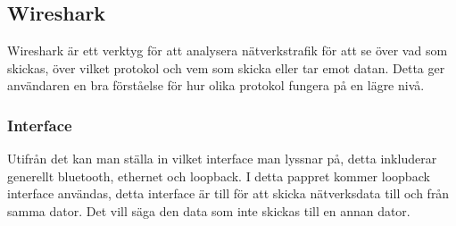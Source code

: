 \subsection{Wireshark}
Wireshark\cite{wireshark:main} är ett verktyg för att analysera nätverkstrafik för att se över vad som skickas, över vilket protokol och vem som skicka eller tar emot datan. Detta ger användaren en bra förståelse för hur olika protokol fungera på en lägre nivå.

\subsubsection{Interface}
Utifrån det kan man ställa in vilket interface\cite[p.~364]{networking} man lyssnar på, detta inkluderar generellt bluetooth, ethernet och loopback. I detta pappret kommer loopback interface användas, detta interface är till för att skicka nätverksdata till och från samma dator. Det vill säga den data som inte skickas till en annan dator.

